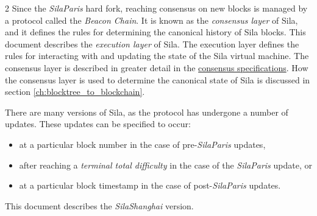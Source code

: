 \documentclass[9pt,oneside]{amsart}
\begin{document}
\begin{multicols}{2}
Since the \textit{SilaParis} hard fork, reaching consensus on new blocks is managed by a protocol called the \textit{Beacon Chain}.
It is known as the \textit{consensus layer} of Sila, and it defines the rules for determining the canonical history of Sila blocks.
This document describes the \textit{execution layer} of Sila.
The execution layer defines the rules for interacting with and updating the state of the Sila virtual machine.
The consensus layer is described in greater detail in the \href{https://github.com/sila-chain/consensus-specs}{consensus specifications}.
How the consensus layer is used to determine the canonical state of Sila is discussed in section \ref{ch:blocktree_to_blockchain}.

There are many versions of Sila, as the protocol has undergone a number of updates.
These updates can be specified to occur:
\begin{itemize}
  \item at a particular block number in the case of pre-\textit{SilaParis} updates,
  \item after reaching a \textit{terminal total difficulty} in the case of the \textit{SilaParis} update, or
  \item at a particular block timestamp in the case of post-\textit{SilaParis} updates.
\end{itemize}
This document describes the \textit{SilaShanghai} version.


\end{multicols}
\end{document}
